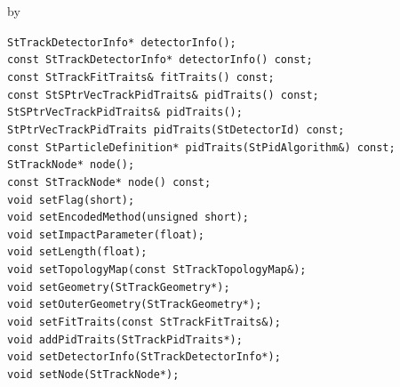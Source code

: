\documentclass[twoside]{article}
\newcommand{\entrylabel}[1]{\mbox{\textbf{{#1}}}\hfil}%
\newenvironment{entry}
{\begin{list}{}%
    {\renewcommand{\makelabel}{\entrylabel}%
     \setlength{\labelwidth}{90pt}%
     \setlength{\leftmargin}{\labelwidth}
     \advance\leftmargin by \labelsep%
      }%
    }%
  {\end{list}}
\newcommand{\Entrylabel}[1]%
{\raisebox{0pt}[1ex][0pt]{\makebox[\labelwidth][l]%
    {\parbox[t]{\labelwidth}{\hspace{0pt}\textbf{{#1}}}}}}
\newenvironment{Entry}%
{\renewcommand{\entrylabel}{\Entrylabel}\begin{entry}}%
  {\end{entry}}
\begin{document}
\begin{Entry}
    \verb+StTrackDetectorInfo* detectorInfo();+\\
    \verb+const StTrackDetectorInfo* detectorInfo() const;+\\
    \verb+const StTrackFitTraits& fitTraits() const;+\\
    \verb+const StSPtrVecTrackPidTraits& pidTraits() const;+\\
    \verb+StSPtrVecTrackPidTraits& pidTraits();+\\
    \verb+StPtrVecTrackPidTraits pidTraits(StDetectorId) const;+\\
    \verb+const StParticleDefinition* pidTraits(StPidAlgorithm&) const;+\\
    \verb+StTrackNode* node();+\\
    \verb+const StTrackNode* node() const;+\\
    \verb+void setFlag(short);+\\
    \verb+void setEncodedMethod(unsigned short);+\\
    \verb+void setImpactParameter(float);+\\
    \verb+void setLength(float);+\\
    \verb+void setTopologyMap(const StTrackTopologyMap&);+\\
    \verb+void setGeometry(StTrackGeometry*);+\\
    \verb+void setOuterGeometry(StTrackGeometry*);+\\
    \verb+void setFitTraits(const StTrackFitTraits&);+\\
    \verb+void addPidTraits(StTrackPidTraits*);+\\
    \verb+void setDetectorInfo(StTrackDetectorInfo*);+\\
    \verb+void setNode(StTrackNode*);+\\
\end{Entry}
\clearpage
\end{document}
